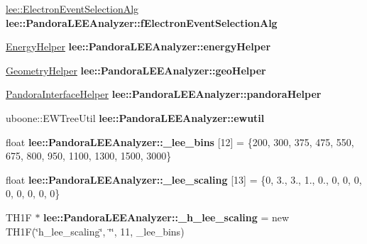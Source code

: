 \begin{DoxyCompactItemize}
\item 
\hypertarget{group__lee_gabc3e2092fa2fa08dce6f6eb6778519ce}{\hyperlink{classlee_1_1ElectronEventSelectionAlg}{lee\-::\-Electron\-Event\-Selection\-Alg} {\bfseries lee\-::\-Pandora\-L\-E\-E\-Analyzer\-::f\-Electron\-Event\-Selection\-Alg}}\label{group__lee_gabc3e2092fa2fa08dce6f6eb6778519ce}

\item 
\hypertarget{group__lee_ga15efa0b525385a8f0ac4547690d44194}{\hyperlink{classEnergyHelper}{Energy\-Helper} {\bfseries lee\-::\-Pandora\-L\-E\-E\-Analyzer\-::energy\-Helper}}\label{group__lee_ga15efa0b525385a8f0ac4547690d44194}

\item 
\hypertarget{group__lee_gaa53a7fef751a9f2aa891b067875eb19b}{\hyperlink{classGeometryHelper}{Geometry\-Helper} {\bfseries lee\-::\-Pandora\-L\-E\-E\-Analyzer\-::geo\-Helper}}\label{group__lee_gaa53a7fef751a9f2aa891b067875eb19b}

\item 
\hypertarget{group__lee_ga00fc07207cfb81cd3cbbe5a8785d3c23}{\hyperlink{classPandoraInterfaceHelper}{Pandora\-Interface\-Helper} {\bfseries lee\-::\-Pandora\-L\-E\-E\-Analyzer\-::pandora\-Helper}}\label{group__lee_ga00fc07207cfb81cd3cbbe5a8785d3c23}

\item 
\hypertarget{group__lee_gaf8493a6adc146f58425a9808bde7de2f}{uboone\-::\-E\-W\-Tree\-Util {\bfseries lee\-::\-Pandora\-L\-E\-E\-Analyzer\-::ewutil}}\label{group__lee_gaf8493a6adc146f58425a9808bde7de2f}

\item 
\hypertarget{group__lee_ga228a9ca7bca5fedf7187f5db8358fd00}{float {\bfseries lee\-::\-Pandora\-L\-E\-E\-Analyzer\-::\-\_\-lee\-\_\-bins} \mbox{[}12\mbox{]} = \{200, 300, 375, 475, 550, 675, 800, 950, 1100, 1300, 1500, 3000\}}\label{group__lee_ga228a9ca7bca5fedf7187f5db8358fd00}

\item 
\hypertarget{group__lee_ga917c3c0cff016b2757b303818dc9b138}{float {\bfseries lee\-::\-Pandora\-L\-E\-E\-Analyzer\-::\-\_\-lee\-\_\-scaling} \mbox{[}13\mbox{]} = \{0, 3., 3., 1., 0., 0, 0, 0, 0, 0, 0, 0, 0\}}\label{group__lee_ga917c3c0cff016b2757b303818dc9b138}

\item 
\hypertarget{group__lee_ga23a7d7c06b601ec3488237c7a70a79f0}{T\-H1\-F $\ast$ {\bfseries lee\-::\-Pandora\-L\-E\-E\-Analyzer\-::\-\_\-h\-\_\-lee\-\_\-scaling} = new T\-H1\-F(\char`\"{}h\-\_\-lee\-\_\-scaling\char`\"{}, \char`\"{}\char`\"{}, 11, \-\_\-lee\-\_\-bins)}\label{group__lee_ga23a7d7c06b601ec3488237c7a70a79f0}


\end{DoxyCompactItemize}
